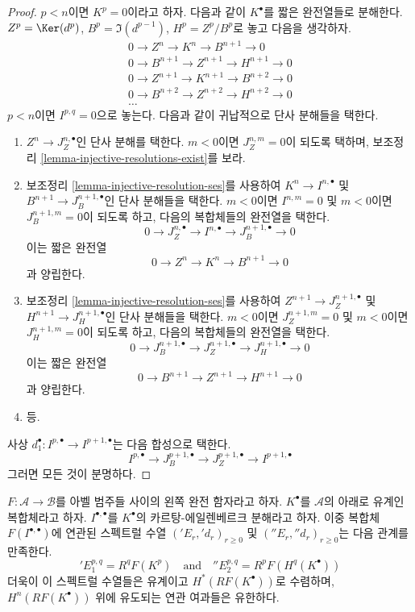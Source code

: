 \begin{proof}
$p < n$이면 $K^p = 0$이라고 하자. 다음과 같이 $K^\bullet$를
짧은 완전열들로 분해한다. $Z^p = \Ker(d^p)$,
$B^p = \Im(d^{p - 1})$, $H^p = Z^p/B^p$로 놓고 다음을 생각하자.
$$
\begin{matrix}
0 \to Z^n \to K^n \to B^{n + 1} \to 0 \\
0 \to B^{n + 1} \to Z^{n + 1} \to H^{n + 1} \to 0 \\
0 \to Z^{n + 1} \to K^{n + 1} \to B^{n + 2} \to 0 \\
0 \to B^{n + 2} \to Z^{n + 2} \to H^{n + 2} \to 0 \\
\ldots
\end{matrix}
$$
$p < n$이면 $I^{p, q} = 0$으로 놓는다. 다음과 같이 귀납적으로
단사 분해들을 택한다.
\begin{enumerate}
\item $Z^n \to J_Z^{n, \bullet}$인 단사 분해를 택한다.
$m < 0$이면 $J_Z^{n, m} = 0$이 되도록 택하며, 보조정리
\ref{lemma-injective-resolutions-exist}를 보라.
\item 보조정리 \ref{lemma-injective-resolution-ses}를 사용하여
$K^n \to I^{n, \bullet}$ 및
$B^{n + 1} \to J_B^{n + 1, \bullet}$인 단사 분해들을 택한다.
$m < 0$이면 $I^{n, m} = 0$ 및 $m < 0$이면
$J_B^{n + 1, m} = 0$이 되도록 하고, 다음의 복합체들의 완전열을 택한다.
$$
0 \to J_Z^{n, \bullet} \to I^{n, \bullet} \to
J_B^{n + 1, \bullet} \to 0
$$
이는 짧은 완전열
$$
0 \to Z^n \to K^n \to B^{n + 1} \to 0
$$
과 양립한다.
\item 보조정리 \ref{lemma-injective-resolution-ses}를 사용하여
$Z^{n + 1} \to J_Z^{n + 1, \bullet}$ 및
$H^{n + 1} \to J_H^{n + 1, \bullet}$인 단사 분해들을 택한다.
$m < 0$이면 $J_Z^{n + 1, m} = 0$ 및 $m < 0$이면
$J_H^{n + 1, m} = 0$이 되도록 하고, 다음의 복합체들의 완전열을 택한다.
$$
0 \to J_B^{n + 1, \bullet} \to J_Z^{n + 1, \bullet}
\to J_H^{n + 1, \bullet} \to 0
$$
이는 짧은 완전열
$$
0 \to B^{n + 1} \to Z^{n + 1} \to H^{n + 1} \to 0
$$
과 양립한다.
\item 등.
\end{enumerate}
사상 $d_1^\bullet : I^{p, \bullet} \to I^{p + 1, \bullet}$는
다음 합성으로 택한다.
$$
I^{p, \bullet} \to J_B^{p + 1, \bullet} \to
J_Z^{p + 1, \bullet} \to I^{p + 1, \bullet}
$$
그러면 모든 것이 분명하다.
\end{proof}

\begin{lemma}
\label{lemma-two-ss-complex-functor}
$F : \mathcal{A} \to \mathcal{B}$를 아벨 범주들 사이의 왼쪽 완전 함자라고 하자.
$K^\bullet$를 $\mathcal{A}$의 아래로 유계인 복합체라고 하자.
$I^{\bullet, \bullet}$를 $K^\bullet$의 카르탕-에일렌베르크 분해라고 하자.
이중 복합체 $F(I^{\bullet, \bullet})$에 연관된 스펙트럴 수열
$({}'E_r, {}'d_r)_{r \geq 0}$ 및
$({}''E_r, {}''d_r)_{r \geq 0}$는 다음 관계를 만족한다.
$$
{}'E_1^{p, q} = R^qF(K^p)
\quad
\text{and}
\quad
{}''E_2^{p, q} = R^pF(H^q(K^\bullet))
$$
더욱이 이 스펙트럴 수열들은 유계이고 $H^*(RF(K^\bullet))$로
수렴하며, $H^n(RF(K^\bullet))$ 위에 유도되는 연관 여과들은 유한하다.
\end{lemma}

